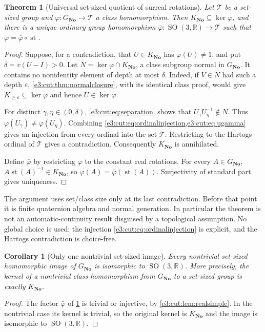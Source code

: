 \documentclass[11pt,letterpaper]{article}
\numberwithin{equation}{section}
\newtheorem{theorem}{Theorem}[section]
\newtheorem{corollary}[corollary]{Corollary}
\theoremstyle{definition}
\theoremstyle{remark}
\newcommand{\No}{\mathbf{No}}
\newcommand{\R}{\mathbb R}
\newcommand{\eps}{\varepsilon}
\newcommand{\st}{\operatorname{st}}
\newcommand{\SO}{\operatorname{SO}}
\begin{document}
\begin{theorem}[Universal set-sized quotient of surreal rotations]\label{e3:cut:thm:smallquotient}
Let $\mathcal T$ be a set-sized group and $\varphi:G_{\No}\to\mathcal T$ a
class homomorphism. Then $K_{\No}\subseteq\ker\varphi$, and there is a unique
ordinary group homomorphism $\bar\varphi:\SO(3,\R)\to\mathcal T$ such that
$\varphi=\bar\varphi\circ\st$.
\end{theorem}
\begin{proof}
Suppose, for a contradiction, that $U\in K_{\No}$ has $\varphi(U)\ne1$, and put
$\delta=v(U-I)>0$. Let $N=\ker\varphi\cap K_{\No}$, a class subgroup normal in
$G_{\No}$. It contains no nonidentity element of depth at most $\delta$.
Indeed, if $V\in N$ had such a depth $\eps$, \cref{e3:cut:thm:normalclosure},
with its identical class proof, would give $K_{\ge\eps}\subseteq\ker\varphi$
and hence $U\in\ker\varphi$.

For distinct $\gamma,\eta\in(0,\delta)$, \cref{e3:cut:eq:separation} shows that
$U_\gamma U_\eta^{-1}\notin N$. Thus $\varphi(U_\gamma)\ne\varphi(U_\eta)$.
Combining \cref{e3:cut:eq:ordinalinjection,e3:cut:eq:ugamma} gives an injection
from every ordinal into the set $\mathcal T$. Restricting to the Hartogs
ordinal of $\mathcal T$ gives a contradiction. Consequently $K_{\No}$ is
annihilated.

Define $\bar\varphi$ by restricting $\varphi$ to the constant real rotations.
For every $A\in G_{\No}$, $A\st(A)^{-1}\in K_{\No}$, so
$\varphi(A)=\bar\varphi(\st(A))$. Surjectivity of standard part gives
uniqueness.
\end{proof}

The argument uses set/class size only at its last contradiction. Before that
point it is finite quaternion algebra and normal generation. In particular the
theorem is not an automatic-continuity result disguised by a topological
assumption. No global choice is used: the injection
\cref{e3:cut:eq:ordinalinjection} is explicit, and the Hartogs contradiction is
choice-free.

\begin{corollary}[Only one nontrivial set-sized image]\label{e3:cut:cor:onlyimage}
Every nontrivial set-sized homomorphic image of $G_{\No}$ is isomorphic to
$\SO(3,\R)$. More precisely, the kernel of a nontrivial class homomorphism from
$G_{\No}$ to a set-sized group is exactly $K_{\No}$.
\end{corollary}
\begin{proof}
The factor $\bar\varphi$ of \cref{e3:cut:thm:smallquotient} is trivial or
injective, by \cref{e3:cut:lem:realsimple}. In the nontrivial case its kernel
is trivial, so the original kernel is $K_{\No}$ and the image is isomorphic to
$\SO(3,\R)$.
\end{proof}
\end{document}
